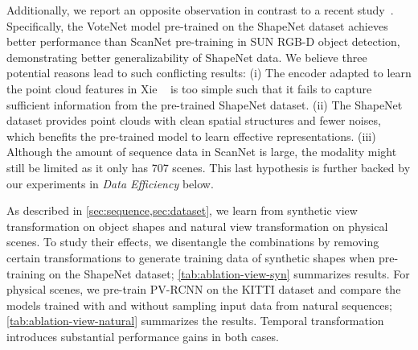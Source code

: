\documentclass[10pt,twocolumn,letterpaper]{article}
\makeatletter
\renewcommand{\paragraph}{\@startsection{paragraph}{4}{\z@}{0ex \@plus 0ex \@minus 0ex}{-1em}{\hskip\parindent\normalfont\normalsize\bfseries}}
\makeatother
\begin{document}

Additionally, we report an opposite observation in contrast to a recent study~\cite{xie2020pointcontrast}. Specifically, the VoteNet model pre-trained on the ShapeNet dataset achieves better performance than ScanNet pre-training in SUN RGB-D object detection, demonstrating better generalizability of ShapeNet data. We believe three potential reasons lead to such conflicting results: (i) The encoder adapted to learn the point cloud features in Xie \etal~\cite{xie2020pointcontrast} is too simple such that it fails to capture sufficient information from the pre-trained ShapeNet dataset. (ii) The ShapeNet dataset provides point clouds with clean spatial structures and fewer noises, which benefits the pre-trained model to learn effective representations. (iii) Although the amount of sequence data in ScanNet is large, the modality might still be limited as it only has 707 scenes. This last hypothesis is further backed by our experiments in \textit{Data Efficiency} below.

\paragraph{Temporal Transformation}

As described in \cref{sec:sequence,sec:dataset}, we learn from synthetic view transformation on object shapes and natural view transformation on physical scenes. To study their effects, we disentangle the combinations by removing certain transformations to generate training data of synthetic shapes when pre-training on the ShapeNet dataset; \cref{tab:ablation-view-syn} summarizes results. For physical scenes, we pre-train PV-RCNN on the KITTI dataset and compare the models trained with and without sampling input data from natural sequences; \cref{tab:ablation-view-natural} summarizes the results. Temporal transformation introduces substantial performance gains in both cases.
\end{document}
